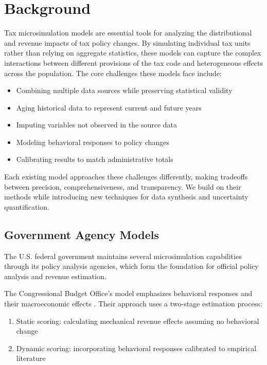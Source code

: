 \section{Background}

Tax microsimulation models are essential tools for analyzing the distributional and revenue impacts of tax policy changes. By simulating individual tax units rather than relying on aggregate statistics, these models can capture the complex interactions between different provisions of the tax code and heterogeneous effects across the population. The core challenges these models face include:

\begin{itemize}
    \item Combining multiple data sources while preserving statistical validity
    \item Aging historical data to represent current and future years
    \item Imputing variables not observed in the source data
    \item Modeling behavioral responses to policy changes
    \item Calibrating results to match administrative totals
\end{itemize}

Each existing model approaches these challenges differently, making tradeoffs between precision, comprehensiveness, and transparency. We build on their methods while introducing new techniques for data synthesis and uncertainty quantification.

\subsection{Government Agency Models}

The U.S. federal government maintains several microsimulation capabilities through its policy analysis agencies, which form the foundation for official policy analysis and revenue estimation.

The Congressional Budget Office's model emphasizes behavioral responses and their macroeconomic effects \citep{cbo2018}. Their approach uses a two-stage estimation process:

\begin{enumerate}
    \item Static scoring: calculating mechanical revenue effects assuming no behavioral change
    \item Dynamic scoring: incorporating behavioral responses calibrated to empirical literature
\end{enumerate}

